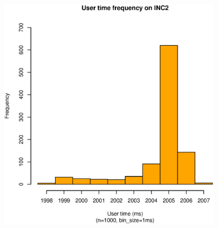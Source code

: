 \begin{figure}[hp!]
{		\includegraphics[scale=0.43]{u_s_time/2_sec_ut_hist.eps}
		\label{fig:inc2_ut_hist}
	}
\end{figure}
